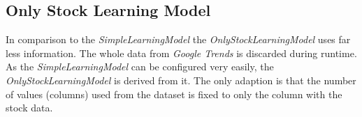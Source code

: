 \subsection{Only Stock Learning Model}
\label{subsec:onlystocklearningmodel}
In comparison to the \textit{SimpleLearningModel} the \textit{OnlyStockLearningModel} uses far less information. The whole data from \textit{Google Trends} is discarded during runtime. As the \textit{SimpleLearningModel} can be configured very easily, the \textit{OnlyStockLearningModel} is derived from it. The only adaption is that the number of values (columns) used from the dataset is fixed to only the column with the stock data.